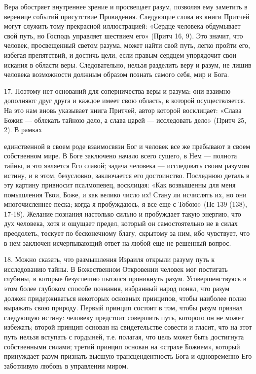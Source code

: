 \documentclass[a5paper,10pt]{article}
\begin{document}
Вера обостряет внутреннее зрение и просвещает разум, позволяя ему заметить в
веренице событий присутствие Провидения. Следующие слова из книги Притчей могут
служить тому прекрасной иллюстрацией: «Сердце человека обдумывает свой путь, но
Господь управляет шествием его» (Притч 16, 9). Это значит, что человек,
просвещенный светом разума, может найти свой путь, легко пройти его, избегая
препятствий, и достичь цели, если правым сердцем упорядочит свои искания в
области веры. Следовательно, нельзя разделить веру и разум, не лишив человека
возможности должным образом познать самого себя, мир и Бога.

17. Поэтому нет оснований для соперничества веры и разума: они взаимно
дополняют друг друга и каждое имеет свою область, в которой осуществляется. На
это нам вновь указывает книга Притчей, автор которой восклицает: «Слава Божия —
облекать тайною дело, а слава царей — исследовать дело» (Притч 25, 2). В рамках

единственной в своем роде взаимосвязи Бог и человек все же пребывают в своем
собственном мире. В Боге заключено начало всего сущего, в Нем — полнота тайны,
и это является Его славой; задача человека — исследовать своим разумом истину,
и в этом, безусловно, заключается его достоинство. Последнюю деталь в эту
картину привносит псалмопевец, восклицая: «Как возвышенны для меня помышления
Твои, Боже, и как велико число их! Стану ли исчислять их, но они многочисленнее
песка; когда я пробуждаюсь, я все еще с Тобою» (Пс 139 (138), 17-18). Желание
познания настолько сильно и пробуждает такую энергию, что дух человека, хотя и
ощущает предел, который он самостоятельно не в силах преодолеть, тоскует по
бесконечному благу, скрытому за ним, ибо чувствует, что в нем заключен
исчерпывающий ответ на любой еще не решенный вопрос.

18. Можно сказать, что размышления Израиля открыли разуму путь к исследованию
тайны. В Божественном Откровении человек мог постигать глубины, в которые
безуспешно пытался проникнуть разум. Усовершенствуясь в этом более глубоком
способе познания, избранный народ понял, что разум должен придерживаться
некоторых основных принципов, чтобы наиболее полно выражать свою природу.
Первый принцип состоит в том, чтобы разум признал следующую истину: человеку
предстоит совершить путь, которого он не может избежать; второй принцип основан
на свидетельстве совести и гласит, что на этот путь нельзя вступать с гордыней,
т.е. полагая, что цель может быть достигнута собственными силами; третий
принцип основан на «страхе Божием», который принуждает разум признать высшую
трансцендентность Бога и одновременно Его заботливую любовь в управлении миром.
\end{document}
